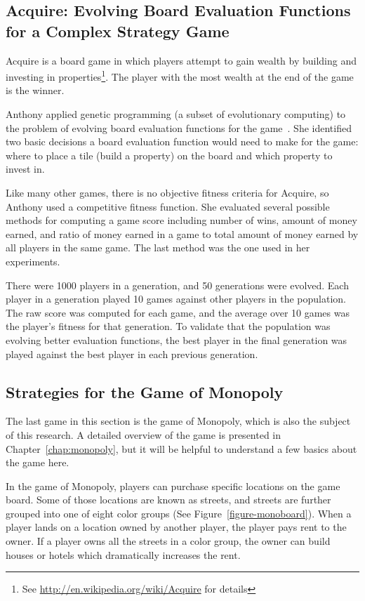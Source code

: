 \subsection{Acquire: Evolving Board Evaluation Functions for a Complex Strategy
Game}

Acquire is a board game in which players attempt to gain wealth by building and
investing in properties\footnote{See \url{http://en.wikipedia.org/wiki/Acquire}
for details}. The player with the most wealth at the end of the game is the
winner.

Anthony applied genetic programming (a subset of evolutionary computing) to the
problem of evolving board evaluation functions for the game~\cite{Anthony2002}.
She identified two basic decisions a board evaluation function would need to
make for the game: where to place a tile (build a property) on the board and
which property to invest in. 

Like many other games, there is no objective fitness criteria for Acquire, so
Anthony used a competitive fitness function. She evaluated several possible
methods for computing a game score including number of wins, amount of money
earned, and ratio of money earned in a game to total amount of money earned by
all players in the same game. The last method was the one used in her
experiments.

There were 1000 players in a generation, and 50 generations were evolved. Each
player in a generation played 10 games against other players in the population.
The raw score was computed for each game, and the average over 10 games was the
player's fitness for that generation. To validate that the population was
evolving better evaluation functions, the best player in the final generation
was played against the best player in each previous generation.

\subsection{Strategies for the Game of Monopoly}

The last game in this section is the game of Monopoly, which is also the
subject of this research. A detailed overview of the game is presented in
Chapter~\ref{chap:monopoly}, but it will be helpful to understand a few basics
about the game here. 

In the game of Monopoly, players can purchase specific locations on the game
board. Some of those locations are known as streets, and streets are further
grouped into one of eight color groups (See Figure~\ref{figure-monoboard}). When
a player lands on a location owned by another player, the player pays rent
to the owner. If a player owns all the streets in a color group, the owner can
build houses or hotels which dramatically increases the rent.

